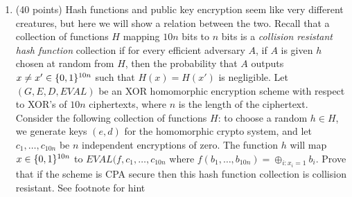 \documentclass{article}
\begin{document}
\begin{enumerate}
\item{}
(40 points) Hash functions and public key encryption seem like very different creatures, but here we will show a relation between the two. Recall that a  collection of functions $H$ mapping $10n$ bits to $n$ bits is a \emph{collision resistant hash function} collection if for every efficient adversary $A$, if $A$ is given $h$ chosen at random from $H$, then the probability that $A$ outputs $x \neq x' \in \{0,1\}^{10n}$ such that $H(x)=H(x')$  is negligible.
Let $(G,E,D,EVAL)$ be an XOR homomorphic encryption scheme with respect to XOR's of $10n$ ciphertexts, where $n$ is the length of the ciphertext.
Consider the following collection of functions $H$: to choose a random $h\in H$, we generate keys $(e,d)$ for the homomorphic crypto system, and let $c_1,\dots,c_{10n}$ be $n$ independent encryptions of zero. The function $h$ will map $x\in\{0,1\}^{10n}$ to $EVAL(f,c_1,\ldots,c_{10n}$ where $f(b_1,\ldots,b_{10n}) = \oplus_{i:x_i=1} b_i$.
Prove that if the scheme is CPA secure then this  hash function collection is collision resistant. See footnote for hint%


\end{enumerate}
\end{document}

